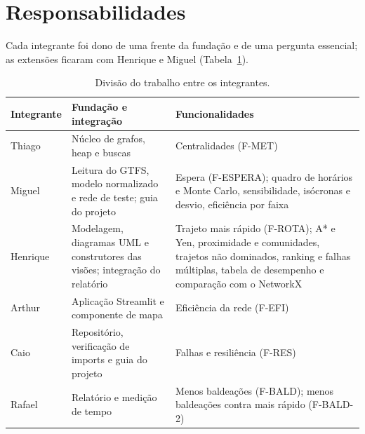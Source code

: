 \section{Responsabilidades}\label{sec:responsabilidades}

Cada integrante foi dono de uma frente da fundação e de uma pergunta essencial; as extensões
ficaram com Henrique e Miguel (Tabela~\ref{tab:responsabilidades}).

\begin{table}[H]
\centering
\caption{Divisão do trabalho entre os integrantes.}
\label{tab:responsabilidades}
\scriptsize
\begin{tabularx}{\textwidth}{@{}l>{\raggedright\arraybackslash}X>{\raggedright\arraybackslash}X@{}}
\toprule
Integrante & Fundação e integração & Funcionalidades \\
\midrule
Thiago   & Núcleo de grafos, heap e buscas & Centralidades (F-MET) \\
Miguel   & Leitura do GTFS, modelo normalizado e rede de teste; guia do projeto & Espera
  (F-ESPERA); quadro de horários e Monte Carlo, sensibilidade, isócronas e desvio, eficiência
  por faixa \\
Henrique & Modelagem, diagramas UML e construtores das visões; integração do relatório &
  Trajeto mais rápido (F-ROTA); A* e Yen, proximidade e comunidades, trajetos não dominados,
  ranking e falhas múltiplas, tabela de desempenho e comparação com o NetworkX \\
Arthur   & Aplicação Streamlit e componente de mapa & Eficiência da rede (F-EFI) \\
Caio     & Repositório, verificação de imports e guia do projeto & Falhas e resiliência (F-RES) \\
Rafael   & Relatório e medição de tempo & Menos baldeações (F-BALD); menos baldeações contra
  mais rápido (F-BALD-2) \\
\bottomrule
\end{tabularx}
\end{table}
